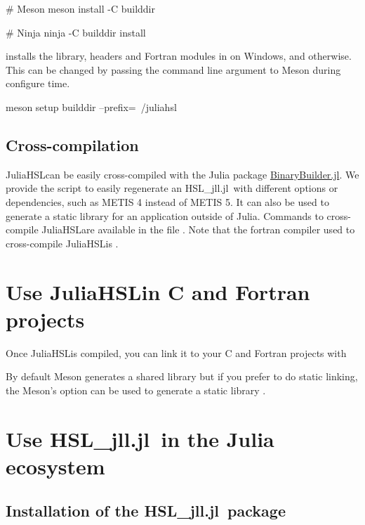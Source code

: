 \documentclass[gdweb]{geradwp}
\newcommand{\JuliaHSL}{JuliaHSL}  %
\newcommand{\HSLjll}{HSL\_jll.jl}
\begin{document}
\begin{jllisting}
# Meson
meson install -C builddir

# Ninja
ninja -C builddir install
\end{jllisting}
installs the library, headers and Fortran modules in  on Windows, and  otherwise.
This can be changed by passing the command line argument  to Meson during configure time.
\begin{jllisting}
meson setup builddir --prefix=~/juliahsl
\end{jllisting}

\subsection{Cross-compilation}

\JuliaHSL can be easily cross-compiled with the Julia package \href{https://github.com/JuliaPackaging/BinaryBuilder.jl}{BinaryBuilder.jl}.
We provide the script  to easily regenerate an \HSLjll~with different options or dependencies, such as METIS 4 instead of METIS 5.
It can also be used to generate a static library  for an application outside of Julia.
Commands to cross-compile \JuliaHSL are available in the file .
Note that the fortran compiler used to cross-compile \JuliaHSL is .

\section{Use \JuliaHSL in C and Fortran projects}

Once \JuliaHSL is compiled, you can link it to your C and Fortran projects with
By default Meson generates a shared library but if you prefer to do static linking, the Meson's option  can be used to generate a static library .

\section{Use \HSLjll~in the Julia ecosystem}

\subsection{Installation of the \HSLjll~package}
\end{document}
